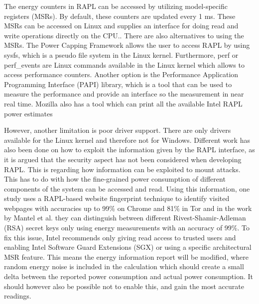



The energy counters in RAPL can be accessed by utilizing model-specific registers (MSRs). By default, these counters are updated every 1 ms. These MSRs can be accessed on Linux and supplies an interface for doing read and write operations directly on the CPU.\cite{linux_manual_msr}. There are also alternatives to using the MSRs. The Power Capping Framework allows the user to access RAPL by using sysfs, which is a pseudo file system in the Linux kernel\cite{PowerCappingFramework,RAPL_in_action}. Furthermore, perf or perf\_events are Linux commands available in the Linux kernel which allows to access performance counters.\cite{Perf_events,RAPL_in_action} 
Another option is the Performance Application Programming Interface (PAPI) library, which is a tool that can be used to measure the performance and provide an interface so the measurement in near real time\cite{PAPI}.
Mozilla also has a tool which can print all the available Intel RAPL power estimates\cite{FireFox}\nytafsnit





However, another limitation is poor driver support. There are only drivers available for the Linux kernel and therefore not for Windows.\cite{RAPL_in_action}  Different work has also been done on how to exploit the information given by the RAPL interface, as it is argued that the security aspect has not been considered when developing RAPL\cite[]{Zhang2021}. This is regarding how information can be exploited to mount attacks. This has to do with how the fine-grained power consumption of different components of the system can be accessed and read. Using this information, one study uses a RAPL-based website fingerprint technique to identify visited webpages with accuracies up to 99\% on Chrome and 81\% in Tor\cite[]{Zhang2021} and in the work by Mantel et al.\cite[]{Mantel2018} they can distinguish between different Rivest-Shamir-Adleman (RSA) secret keys only using energy measurements with an accuracy of 99\%. To fix this issue, Intel recommends only giving read access to trusted users and enabling Intel Software Guard Extensions (SGX) or using a specific architectural MSR feature. This means the energy information report will be modified, where random energy noise is included in the calculation which should create a small delta between the reported power consumption and actual power consumption. It should however also be possible not to enable this, and gain the most accurate readings.\cite[]{intel_rapl_security}

